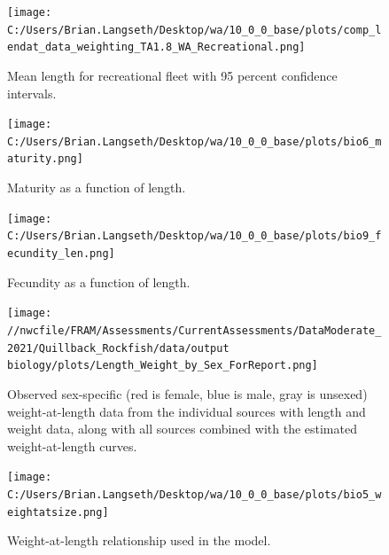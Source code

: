 \documentclass[11pt,
  english,
  letterpaper,
]{article}
\begin{document}
\tagmcend\tagstructend


\begin{figure}
\centering
\texttt{[image: C:/Users/Brian.Langseth/Desktop/wa/10\_0\_0\_base/plots/comp\_lendat\_data\_weighting\_TA1.8\_WA\_Recreational.png]}
\caption{Mean length for recreational fleet with 95 percent confidence intervals.\label{fig:mean-rec-len-data}}
\end{figure}

\tagmcend\tagstructend


\begin{figure}
\centering
\texttt{[image: C:/Users/Brian.Langseth/Desktop/wa/10\_0\_0\_base/plots/bio6\_maturity.png]}
\caption{Maturity as a function of length.\label{fig:maturity}}
\end{figure}

\tagmcend\tagstructend


\begin{figure}
\centering
\texttt{[image: C:/Users/Brian.Langseth/Desktop/wa/10\_0\_0\_base/plots/bio9\_fecundity\_len.png]}
\caption{Fecundity as a function of length.\label{fig:fecundity}}
\end{figure}

\tagmcend\tagstructend


\begin{figure}
\centering
\texttt{[image: //nwcfile/FRAM/Assessments/CurrentAssessments/DataModerate\_2021/Quillback\_Rockfish/data/output biology/plots/Length\_Weight\_by\_Sex\_ForReport.png]}
\caption{Observed sex-specific (red is female, blue is male, gray is unsexed) weight-at-length data from the individual sources with length and weight data, along with all sources combined with the estimated weight-at-length curves.\label{fig:len-weight-survey}}
\end{figure}

\tagmcend\tagstructend


\begin{figure}
\centering
\texttt{[image: C:/Users/Brian.Langseth/Desktop/wa/10\_0\_0\_base/plots/bio5\_weightatsize.png]}
\caption{Weight-at-length relationship used in the model.\label{fig:len-weight}}
\end{figure}
\end{document}
